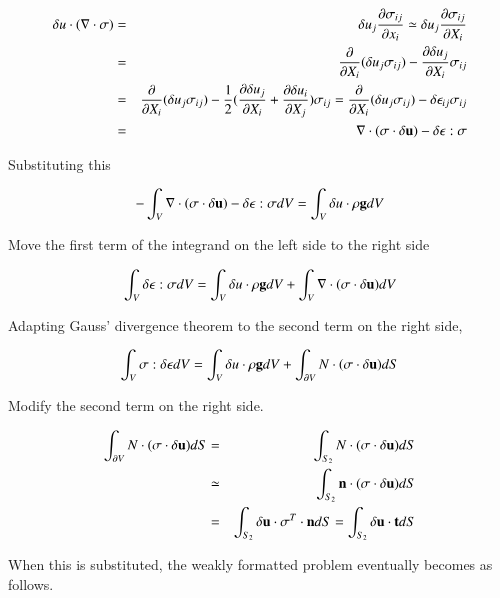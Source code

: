 \begin{eqnarray}
\delta u\cdot(\nabla\cdot\mathbf{\sigma})
&=& \delta u_j\frac{\partial\sigma_{ij}}{\partial x_i}\simeq\delta u_j\frac{\partial\sigma_{ij}}{\partial X_i}\\
&=& \frac{\partial}{\partial X_i}(\delta u_j\sigma_{ij})-\frac{\partial\delta u_j}{\partial X_i}\sigma_{ij}\\
&=& \frac{\partial}{\partial X_i}(\delta u_j\sigma_{ij})-\frac{1}{2}(\frac{\partial\delta u_j}{\partial X_i}+\frac{\partial\delta u_i}{\partial X_j})\sigma_{ij}=\frac{\partial}{\partial X_i}(\delta u_j\sigma_{ij})-\delta\epsilon_{ij}\sigma_{ij}\\
&=& \nabla\cdot(\sigma\cdot\delta\mathbf{u})-\delta\mathbf{\epsilon}:\mathbf{\sigma}
\end{eqnarray}

Substituting this

\begin{equation}
 -\int_V\nabla\cdot(\sigma\cdot\delta\mathbf{u})-\delta\mathbf{\epsilon}:\mathbf{\sigma}dV=\int_V\delta u\cdot\rho\mathbf{g}dV
\end{equation}


Move the first term of the integrand on the left side to the right side

\begin{equation}
 \int_V\delta\mathbf{\epsilon}:\mathbf{\sigma}dV=\int_V\delta u\cdot\rho\mathbf{g}dV+\int_V\nabla\cdot(\sigma\cdot\delta\mathbf{u})dV
\end{equation}


Adapting Gauss' divergence theorem to the second term on the right side,

\begin{equation}
\int_V\mathbf{\sigma}:\delta\mathbf{\epsilon}dV=\int_V\delta u\cdot\rho\mathbf{g}dV+\int_{\partial V}N\cdot(\sigma\cdot\delta\mathbf{u})dS
\end{equation}


Modify the second term on the right side.

\begin{eqnarray}
\int_{\partial V}N\cdot(\sigma\cdot\delta\mathbf{u})dS
&=& \int_{S_2}N\cdot(\sigma\cdot\delta\mathbf{u})dS\\
&\simeq& \int_{S_2}\mathbf{n}\cdot(\sigma\cdot\delta\mathbf{u})dS\\
&=& \int_{S_2}\delta\mathbf{u}\cdot\sigma^T\cdot\mathbf{n}dS=\int_{S_2}\delta\mathbf{u}\cdot\mathbf{t}dS
\end{eqnarray}

When this is substituted, the weakly formatted problem eventually becomes as follows.


